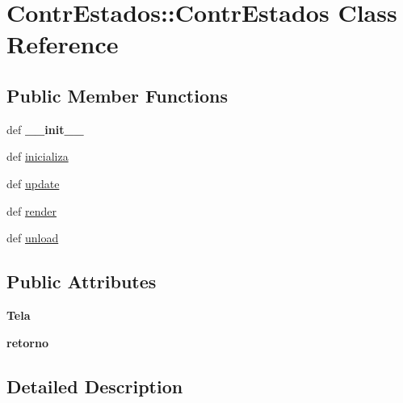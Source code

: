 \hypertarget{class_contr_estados_1_1_contr_estados}{
\section{ContrEstados::ContrEstados Class Reference}
\label{class_contr_estados_1_1_contr_estados}
}
\subsection*{Public Member Functions}
\begin{CompactItemize}
\item 
\hypertarget{class_contr_estados_1_1_contr_estados_12de37d29b3d30a3af2c48643dc69daa}{
def \textbf{\_\-\_\-init\_\-\_\-}}
\label{class_contr_estados_1_1_contr_estados_12de37d29b3d30a3af2c48643dc69daa}

\item 
def \hyperlink{class_contr_estados_1_1_contr_estados_e72809cd793410f555310ea810f0567e}{inicializa}
\item 
def \hyperlink{class_contr_estados_1_1_contr_estados_c512038ba8b7fe6122aa7bb94d14795a}{update}
\item 
def \hyperlink{class_contr_estados_1_1_contr_estados_bd0156c12ca63cbd72d15d810f0815bc}{render}
\item 
def \hyperlink{class_contr_estados_1_1_contr_estados_667dcf2cf83d81231060e3e6345f047e}{unload}
\end{CompactItemize}
\subsection*{Public Attributes}
\begin{CompactItemize}
\item 
\hypertarget{class_contr_estados_1_1_contr_estados_4283bb023bc95bfde7d1ae48680f2f42}{
\textbf{Tela}}
\label{class_contr_estados_1_1_contr_estados_4283bb023bc95bfde7d1ae48680f2f42}

\item 
\hypertarget{class_contr_estados_1_1_contr_estados_bc1c0e1022f89148aca0b747b46abd91}{
\textbf{retorno}}
\label{class_contr_estados_1_1_contr_estados_bc1c0e1022f89148aca0b747b46abd91}

\end{CompactItemize}


\subsection{Detailed Description}



